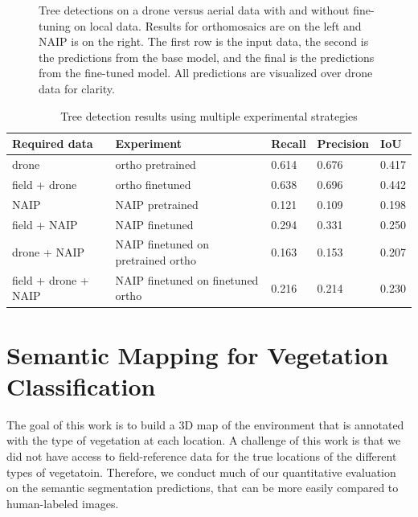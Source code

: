\begin{figure}[h]
    \hfill
    \caption{Tree detections on a drone versus aerial data with and without fine-tuning on local data. Results for orthomosaics are on the left and NAIP is on the right. The first row is the input data, the second is the predictions from the base model, and the final is the predictions from the fine-tuned model. All predictions are visualized over drone data for clarity.
    }
    \label{fig:results:tree_det}
\end{figure}

\begin{table}[]
    \centering
    \begin{tabular}{|l|l|l|l|l|}
        \hline
        \textbf{Required data} & \textbf{Experiment} & \textbf{Recall} & \textbf{Precision} & \textbf{IoU} \\
        \hline \hline
        drone &  ortho pretrained & 0.614 & 0.676 & 0.417\\ \hline 
        field + drone &  ortho finetuned & 0.638 & 0.696 & 0.442\\ \hline 
        NAIP &  NAIP pretrained & 0.121 & 0.109 & 0.198\\ \hline 
        field + NAIP &  NAIP finetuned & 0.294 & 0.331 & 0.250\\ \hline 
        drone + NAIP & NAIP finetuned on pretrained ortho  & 0.163 & 0.153 & 0.207\\ \hline 
        field + drone + NAIP &  NAIP finetuned on finetuned ortho & 0.216 & 0.214 & 0.230\\ \hline 
     \end{tabular}
    \caption{Tree detection results using multiple experimental strategies}
    \label{tab:results:tree_det}
\end{table}



\section{Semantic Mapping for Vegetation Classification}
The goal of this work is to build a 3D map of the environment that is annotated with the type of vegetation at each location. A challenge of this work is that we did not have access to field-reference data for the true locations of the different types of vegetatoin. Therefore, we conduct much of our quantitative evaluation on the semantic segmentation predictions, that can be more easily compared to human-labeled images. 

